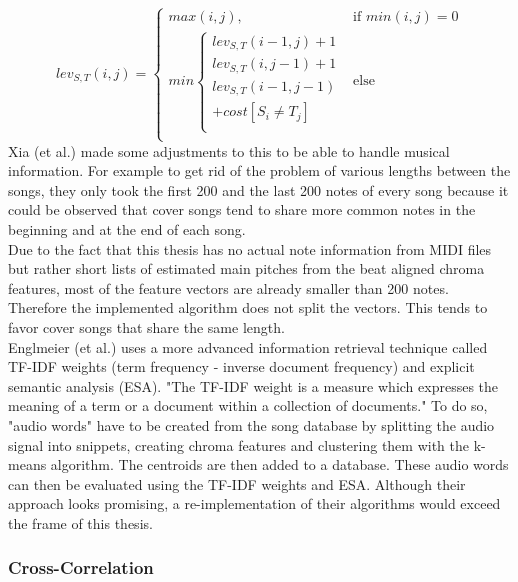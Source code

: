 \begin{equation} \label{eq:tr1}
lev_{S,T}(i, j) = \begin{cases}
max(i, j), &\text{if } min(i, j) = 0\\
min \begin{cases}
lev_{S,T}(i-1, j) + 1\\
lev_{S,T}(i, j-1) + 1\\
lev_{S,T}(i-1, j-1)\\
+cost[S_i \neq T_j]\\
\end{cases} &\text{else} \\
\end{cases}
\end{equation}
Xia (et al.) made some adjustments to this to be able to handle musical information.\cite[pp. 7ff]{chroma4} For example to get rid of the problem of various lengths between the songs, they only took the first 200 and the last 200 notes of every song because it could be observed that cover songs tend to share more common notes in the beginning and at the end of each song.\\
Due to the fact that this thesis has no actual note information from MIDI files but rather short lists of estimated main pitches from the beat aligned chroma features, most of the feature vectors are already smaller than 200 notes. Therefore the implemented algorithm does not split the vectors. This tends to favor cover songs that share the same length. 
\ \\
Englmeier (et al.) uses a more advanced information retrieval technique called TF-IDF weights (term frequency - inverse document frequency) and explicit semantic analysis (ESA). "The TF-IDF weight is a measure which expresses the meaning of a term or a document within a collection of documents." \cite[p. 186]{chroma1}
To do so, "audio words" have to be created from the song database by splitting the audio signal into snippets, creating chroma features and clustering them with the k-means algorithm. The centroids are then added to a database. These audio words can then be evaluated using the TF-IDF weights and ESA.
Although their approach looks promising, a re-implementation of their algorithms would exceed the frame of this thesis.

\subsubsection{Cross-Correlation}\label{crosscorrsec}

